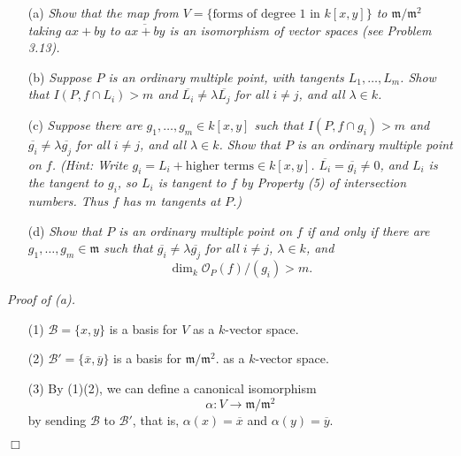 \documentclass{article}
\begin{document}
\begin{enumerate}
\item[(a)]
  \emph{Show that the map from $V = \{ \text{forms of degree $1$ in $k[x,y]$} \}$ to
  $\mathfrak{m}/\mathfrak{m}^2$ taking $ax+by$ to $\overline{ax+by}$
  is an isomorphism of vector spaces (see Problem 3.13). }

\item[(b)]
  \emph{Suppose $P$ is an ordinary multiple point, with tangents $L_1, \ldots, L_m$.
  Show that $I(P, f \cap L_i) > m$ and
  $\overline{L_i} \neq \lambda \overline{L_j}$ for all $i \neq j$, and all $\lambda \in k$.}

\item[(c)]
  \emph{Suppose there are $g_1, \ldots, g_m \in k[x,y]$
  such that $I(P, f \cap g_i) > m$ and
  $\overline{g_i} \neq \lambda \overline{g_j}$ for all $i \neq j$, and all $\lambda \in k$.
  Show that $P$ is an ordinary multiple point on $f$.
  (Hint: Write $g_i = L_i + \text{higher terms} \in k[x,y]$.
  $\overline{L_i} = \overline{g_i} \neq 0$,
  and $L_i$ is the tangent to $g_i$,
  so $L_i$ is tangent to $f$ by Property (5) of intersection numbers.
  Thus $f$ has $m$ tangents at $P$.)}

\item[(d)]
  \emph{Show that $P$ is an ordinary multiple point on $f$ if and only if
  there are $g_1, \ldots, g_m \in \mathfrak{m}$ such that
  $\overline{g_i} \neq \lambda \overline{g_j}$ for all $i \neq j$, $\lambda \in k$,
  and} \\
  \[
    \dim_k \mathscr{O}_P(f)/(g_i) > m.
  \]
\end{enumerate}



\emph{Proof of (a).}
\begin{enumerate}
\item[(1)]
  $\mathscr{B} = \{ x, y \}$ is a basis for $V$ as a $k$-vector space.

\item[(2)]
  $\mathscr{B}' = \{ \overline{x}, \overline{y} \}$ is a basis for $\mathfrak{m}/\mathfrak{m}^2$.
  as a $k$-vector space.

\item[(3)]
  By (1)(2), we can define a canonical isomorphism
  \[
    \alpha: V \to \mathfrak{m}/\mathfrak{m}^2
  \]
  by sending $\mathscr{B}$ to $\mathscr{B}'$, that is,
  $\alpha(x) = \overline{x}$ and $\alpha(y) = \overline{y}$.
\end{enumerate}
$\Box$ \\
\end{document}
